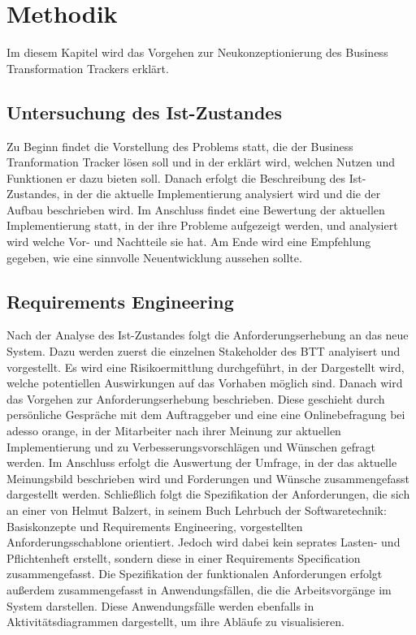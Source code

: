 \section{Methodik}
Im diesem Kapitel wird das Vorgehen zur Neukonzeptionierung des Business Transformation Trackers erklärt.

\subsection{Untersuchung des Ist-Zustandes}
Zu Beginn findet die Vorstellung des Problems statt, die der Business Tranformation Tracker lösen soll und in der erklärt wird, welchen Nutzen und Funktionen er dazu bieten soll. Danach erfolgt die Beschreibung des Ist-Zustandes, in der die aktuelle Implementierung analysiert wird und die der Aufbau beschrieben wird. Im Anschluss findet eine Bewertung der aktuellen Implementierung statt, in der ihre Probleme aufgezeigt werden, und analysiert wird welche Vor- und Nachtteile sie hat. Am Ende wird eine Empfehlung gegeben, wie eine sinnvolle Neuentwicklung aussehen sollte.

\subsection{Requirements Engineering}
Nach der Analyse des Ist-Zustandes folgt die Anforderungserhebung an das neue System. Dazu werden zuerst die einzelnen Stakeholder des BTT analyisert und vorgestellt. Es wird eine Risikoermittlung durchgeführt, in der Dargestellt wird, welche potentiellen Auswirkungen auf das Vorhaben möglich sind. Danach wird das Vorgehen zur Anforderungserhebung beschrieben. Diese geschieht durch persönliche Gespräche mit dem Auftraggeber und eine eine Onlinebefragung bei adesso orange, in der Mitarbeiter nach ihrer Meinung zur aktuellen Implementierung und zu Verbesserungsvorschlägen und Wünschen gefragt werden. Im Anschluss erfolgt die Auswertung der Umfrage, in der das aktuelle Meinungsbild beschrieben wird und Forderungen und Wünsche zusammengefasst dargestellt werden. Schließlich folgt die Spezifikation der Anforderungen, die sich an einer von Helmut Balzert, in seinem Buch \glqq{}Lehrbuch der Softwaretechnik: Basiskonzepte und Requirements Engineering\grqq{}, vorgestellten Anforderungsschablone orientiert. Jedoch wird dabei kein seprates Lasten- und Pflichtenheft erstellt, sondern diese in einer \glqq{}Requirements Specification\grqq{} zusammengefasst. Die Spezifikation der funktionalen Anforderungen erfolgt außerdem zusammengefasst in Anwendungsfällen, die die Arbeitsvorgänge im System darstellen. Diese Anwendungsfälle werden ebenfalls in Aktivitätsdiagrammen dargestellt, um ihre Abläufe zu visualisieren. 

